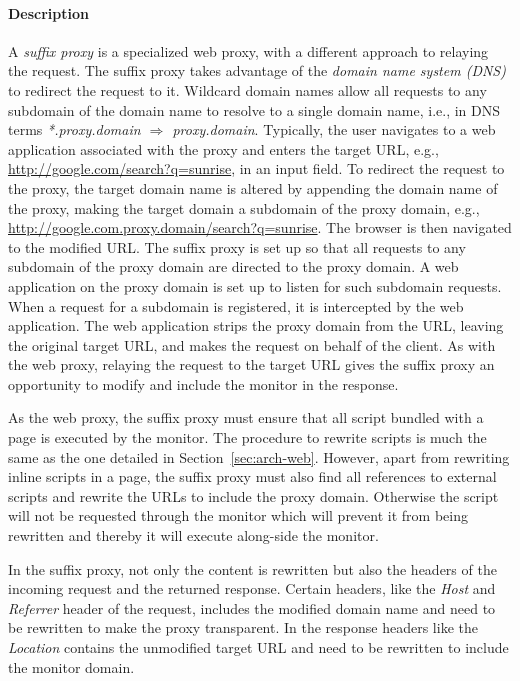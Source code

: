 \documentclass{llncs}
\newcommand{\todo}[1]{\colorbox{red}{\textcolor{white}{\sffamily\bfseries\scriptsize TODO}} \textcolor{red}{#1} \textcolor{red}{$\blacktriangleleft$}}
\begin{document}
\paragraph{Description}
A \emph{suffix proxy} is a specialized web proxy, with a different approach to relaying the request. 
The suffix proxy takes advantage of the \emph{domain name system (DNS)} to redirect the request to it.
Wildcard domain names allow all requests to any subdomain of the domain name to resolve to a single domain name, 
i.e., in DNS terms \emph{*.proxy.domain $\Rightarrow$ proxy.domain}.
Typically, the user navigates to a 
web application associated with the proxy and enters the target URL, e.g., \url{http://google.com/search?q=sunrise}, in 
an input field. To redirect the request to the proxy, the target domain name is altered
by appending the domain name of the proxy, making the target domain a subdomain of the proxy domain, e.g., \url{http://google.com.proxy.domain/search?q=sunrise}. 
The browser is then navigated to the modified URL.
The suffix proxy is set up so
that all requests to any subdomain of the proxy domain are directed to the proxy domain. 
A web application on the proxy domain is set up to listen for such subdomain requests.
When a request for a subdomain is registered, it is intercepted by the web application.
The web application strips the proxy domain from the URL, leaving the original target URL, 
and makes the request on behalf of the client. As with the web proxy, 
relaying the request to the target URL gives the suffix proxy an opportunity to modify and 
include the monitor in the response.

As the web proxy, the suffix proxy must ensure that all script bundled with a 
page is executed by the monitor. The procedure to rewrite scripts is much the same as the one
detailed in Section~\ref{sec:arch-web}. However, apart from rewriting inline scripts in a page, 
the suffix proxy must also find all references to external scripts and rewrite the URLs to include the proxy domain.
Otherwise the script will not be requested through the monitor which will 
prevent it from being rewritten and thereby it will execute along-side the monitor.


In the suffix proxy, not only the content is rewritten
but also the headers of the incoming request and the returned response.
Certain headers, like the \emph{Host} and \emph{Referrer} header of the request, includes the 
modified domain name and need to be rewritten to make the proxy transparent. In 
the response headers like the \emph{Location} contains the unmodified target URL and 
need to be rewritten to include the monitor domain. 
\end{document}
